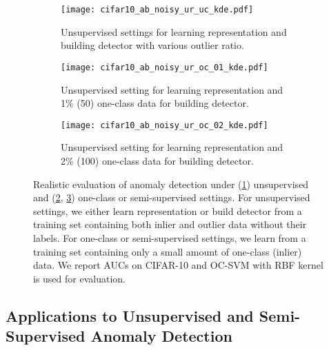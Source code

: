 \documentclass{article} \usepackage{iclr2021_conference,times}
\begin{document}
\begin{figure}[t]
    \centering
    \begin{subfigure}{.32\textwidth}
        \centering
        \texttt{[image: cifar10\_ab\_noisy\_ur\_uc\_kde.pdf]}
        \caption{Unsupervised settings for learning representation and building detector with various outlier ratio.}
        \label{fig:ab_unsupervised}
    \end{subfigure}
    \hspace{0.01in}
    \begin{subfigure}{.32\textwidth}
        \centering
        \texttt{[image: cifar10\_ab\_noisy\_ur\_oc\_01\_kde.pdf]}
        \caption{Unsupervised setting for learning representation and 1\% (50) one-class data for building detector.}
        \label{fig:ab_semi_supervised_1}
    \end{subfigure}
    \hspace{0.01in}
    \begin{subfigure}{.32\textwidth}
        \centering
        \texttt{[image: cifar10\_ab\_noisy\_ur\_oc\_02\_kde.pdf]}
        \caption{Unsupervised setting for learning representation and 2\% (100) one-class data for building detector.}
        \label{fig:ab_semi_supervised_2}
    \end{subfigure}
    \vspace{-0.08in}
    \caption{Realistic evaluation of anomaly detection under (\ref{fig:ab_unsupervised}) unsupervised and (\ref{fig:ab_semi_supervised_1}, \ref{fig:ab_semi_supervised_2}) one-class or semi-supervised settings. For unsupervised settings, we either learn representation or build detector from a training set containing both inlier and outlier data without their labels. For one-class or semi-supervised settings, we learn from a training set containing only a small amount of one-class (inlier) data. We report AUCs on CIFAR-10 and OC-SVM with RBF kernel is used for evaluation.}
    \label{fig:ab_anomaly_detection}
    \vspace{-0.15in}
\end{figure}


\vspace{-0.05in}
\subsection{Applications to Unsupervised and Semi-Supervised Anomaly Detection}
\label{sec:ablation_unsupervised}
\vspace{-0.05in}
\end{document}
